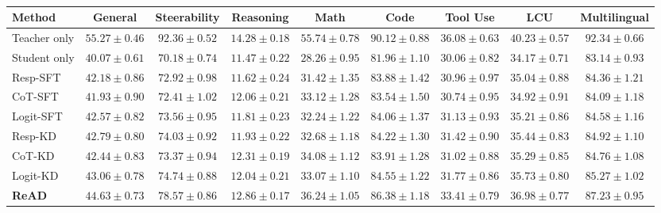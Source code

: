 \begin{table}[t]
\centering
\tiny
\setlength\tabcolsep{1pt}
\caption{}
\begin{tabular}{lcccccccc}
\toprule
\textbf{Method} &
\textbf{General} &
\textbf{Steerability} &
\textbf{Reasoning} &
\textbf{Math} &
\textbf{Code} &
\textbf{Tool Use} &
\textbf{LCU} &
\textbf{Multilingual} \\
\midrule
Teacher only &
$55.27 \pm 0.46$ &
$92.36 \pm 0.52$ &
$14.28 \pm 0.18$ &
$55.74 \pm 0.78$ &
$90.12 \pm 0.88$ &
$36.08 \pm 0.63$ &
$40.23 \pm 0.57$ &
$92.34 \pm 0.66$ \\
Student only &
$40.07 \pm 0.61$ &
$70.18 \pm 0.74$ &
$11.47 \pm 0.22$ &
$28.26 \pm 0.95$ &
$81.96 \pm 1.10$ &
$30.06 \pm 0.82$ &
$34.17 \pm 0.71$ &
$83.14 \pm 0.93$ \\
\midrule
Resp-SFT &
$42.18 \pm 0.86$ &
$72.92 \pm 0.98$ &
$11.62 \pm 0.24$ &
$31.42 \pm 1.35$ &
$83.88 \pm 1.42$ &
$30.96 \pm 0.97$ &
$35.04 \pm 0.88$ &
$84.36 \pm 1.21$ \\
CoT-SFT &
$41.93 \pm 0.90$ &
$72.41 \pm 1.02$ &
$12.06 \pm 0.21$ &
$33.12 \pm 1.28$ &
$83.54 \pm 1.50$ &
$30.74 \pm 0.95$ &
$34.92 \pm 0.91$ &
$84.09 \pm 1.18$ \\
Logit-SFT &
$42.57 \pm 0.82$ &
$73.56 \pm 0.95$ &
$11.81 \pm 0.23$ &
$32.24 \pm 1.22$ &
$84.06 \pm 1.37$ &
$31.13 \pm 0.93$ &
$35.21 \pm 0.86$ &
$84.58 \pm 1.16$ \\
Resp-KD &
$42.79 \pm 0.80$ &
$74.03 \pm 0.92$ &
$11.93 \pm 0.22$ &
$32.68 \pm 1.18$ &
$84.22 \pm 1.30$ &
$31.42 \pm 0.90$ &
$35.44 \pm 0.83$ &
$84.92 \pm 1.10$ \\
CoT-KD &
$42.44 \pm 0.83$ &
$73.37 \pm 0.94$ &
$12.31 \pm 0.19$ &
$34.08 \pm 1.12$ &
$83.91 \pm 1.28$ &
$31.02 \pm 0.88$ &
$35.29 \pm 0.85$ &
$84.76 \pm 1.08$ \\
Logit-KD &
$43.06 \pm 0.78$ &
$74.74 \pm 0.88$ &
$12.04 \pm 0.21$ &
$33.07 \pm 1.10$ &
$84.55 \pm 1.22$ &
$31.77 \pm 0.86$ &
$35.73 \pm 0.80$ &
$85.27 \pm 1.02$ \\
\midrule
\textbf{ReAD} &
$\mathbf{44.63 \pm 0.73}$ &
$\mathbf{78.57 \pm 0.86}$ &
$\mathbf{12.86 \pm 0.17}$ &
$\mathbf{36.24 \pm 1.05}$ &
$\mathbf{86.38 \pm 1.18}$ &
$\mathbf{33.41 \pm 0.79}$ &
$\mathbf{36.98 \pm 0.77}$ &
$\mathbf{87.23 \pm 0.95}$ \\
\bottomrule
\end{tabular}
\label{tab:qwen_20m}
\end{table}


